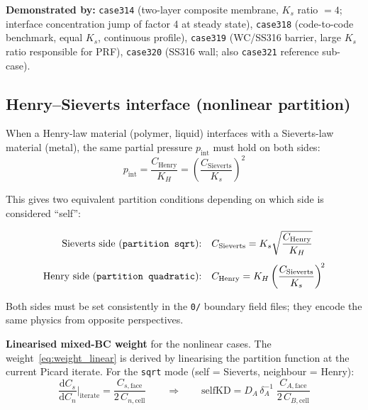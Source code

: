 \documentclass[11pt,a4paper]{article}
\newcommand{\caseref}[1]{\texttt{\color{casegreen}#1}}
\begin{document}
\begin{tcolorbox}[casebox]
  \textbf{Demonstrated by:} \caseref{case314} (two-layer composite membrane,
  $K_s$ ratio $= 4$; interface concentration jump of factor 4 at steady state),
  \caseref{case318} (code-to-code benchmark, equal $K_s$, continuous profile),
  \caseref{case319} (WC/SS316 barrier, large $K_s$ ratio responsible for PRF),
  \caseref{case320} (SS316 wall; also \caseref{case321} reference sub-case).
\end{tcolorbox}

\subsection{Henry--Sieverts interface (nonlinear partition)}
\label{sec:bc_nonlinear}

When a Henry-law material (polymer, liquid) interfaces with a Sieverts-law
material (metal), the same partial pressure $p_\text{int}$ must hold on both
sides:
\[
  p_\text{int} = \frac{C_\text{Henry}}{K_H} = \left(\frac{C_\text{Sieverts}}{K_s}\right)^{\!2}
\]

This gives two equivalent partition conditions depending on which side is
considered ``self'':

\begin{tcolorbox}[eqbox,title={Henry--Sieverts partition}]
\begin{align}
  \label{eq:sqrt_part}
  \text{Sieverts side (\texttt{partition sqrt}):} \quad
  &C_\text{Sieverts} = K_s \sqrt{\dfrac{C_\text{Henry}}{K_H}}\\[4pt]
  \label{eq:quad_part}
  \text{Henry side (\texttt{partition quadratic}):} \quad
  &C_\text{Henry} = K_H \left(\dfrac{C_\text{Sieverts}}{K_s}\right)^{\!2}
\end{align}
\end{tcolorbox}

Both sides must be set consistently in the \texttt{0/} boundary field files;
they encode the same physics from opposite perspectives.

\textbf{Linearised mixed-BC weight} for the nonlinear cases.
The weight~\eqref{eq:weight_linear} is derived by linearising the partition
function at the current Picard iterate.  For the \texttt{sqrt} mode
(self = Sieverts, neighbour = Henry):
\begin{equation}\label{eq:weight_sqrt}
  \frac{\mathrm{d}C_s}{\mathrm{d}C_n}\bigg|_\text{iterate}
  = \frac{C_{s,\text{face}}}{2\,C_{n,\text{cell}}}
  \qquad\Rightarrow\qquad
  \text{selfKD} = D_A\,\delta_A^{-1}\;\frac{C_{A,\text{face}}}{2\,C_{B,\text{cell}}}
\end{equation}
\end{document}
